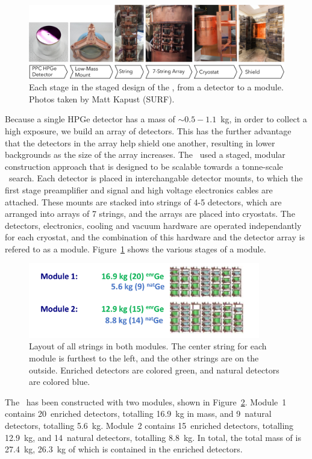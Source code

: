 \documentclass[/main.tex]{subfiles}
\begin{document}
\begin{figure}[h]
  \centering
  \includegraphics[width=\textwidth]{Modular_Design}
  \caption[Modular design of the \MJD]{\label{fig:modulardesign}
    Each stage in the staged design of the \MJD, from a detector to a module. Photos taken by Matt Kapust (SURF).
  }
\end{figure}
Because a single HPGe detector has a mass of ${\sim}0.5-1.1$~kg, in order to collect a high exposure, we build an array of detectors.
This has the further advantage that the detectors in the array help shield one another, resulting in lower backgrounds as the size of the array increases.
The \MJD\ used a staged, modular construction approach that is designed to be scalable towards a tonne-scale \znbb\ search.
Each detector is placed in interchangable detector mounts, to which the first stage preamplifier and signal and high voltage electronics cables are attached.
These mounts are stacked into strings of 4-5 detectors, which are arranged into arrays of 7 strings, and the arrays are placed into cryostats.
The detectors, electronics, cooling and vacuum  hardware are operated independantly for each cryostat, and the combination of this hardware and the detector array is refered to as a module.
Figure~\ref{fig:modulardesign} shows the various stages of a module.

\begin{figure}[h]
  \centering
  \includegraphics[width=0.9\textwidth]{modules}
  \caption[Layout of all strings in both modules with natural and enriched detectors labelled]{ \label{fig:modules}
    Layout of all strings in both modules. The center string for each module is furthest to the left, and the other strings are on the outside. Enriched detectors are colored green, and natural detectors are colored blue.
  }
\end{figure}
The \MJD\ has been constructed with two modules, shown in Figure~\ref{fig:modules}.
Module~1 contains 20~enriched detectors, totalling 16.9~kg in mass, and 9~natural detectors, totalling 5.6~kg.
Module~2 contains 15~enriched detectors, totalling 12.9~kg, and 14~natural detectors, totalling 8.8~kg.
In total, the total mass of  is 27.4~kg, 26.3~kg of which is contained in the enriched detectors.
\end{document}
